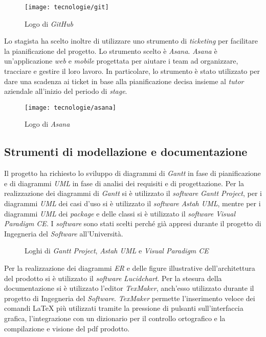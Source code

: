 \begin{figure}[!h] 
    \centering 
    \texttt{[image: tecnologie/git]} 
    \caption{Logo di \textit{GitHub}}
\end{figure}

Lo stagista ha scelto inoltre di utilizzare uno strumento di \textit{ticketing} per facilitare la pianificazione del progetto. Lo strumento scelto è \textit{Asana}. \textit{Asana} è un'applicazione \textit{web} e \textit{mobile} progettata per aiutare i team ad organizzare, tracciare e gestire il loro lavoro. In particolare, lo strumento è stato utilizzato per dare una scadenza ai ticket in base alla pianificazione decisa insieme al \textit{tutor} aziendale all'inizio del periodo di \textit{stage}.

\begin{figure}[!h] 
    \centering 
    \texttt{[image: tecnologie/asana]} 
    \caption{Logo di \textit{Asana}}
\end{figure}

\subsection{Strumenti di modellazione e documentazione}

Il progetto ha richiesto lo sviluppo di diagrammi di \textit{Gantt} in fase di pianificazione e di diagrammi \textit{UML} in fase di analisi dei requisiti e di progettazione. Per la realizzazione dei diagrammi di \textit{Gantt} si è utilizzato il \textit{software} \textit{Gantt Project}, per i diagrammi \textit{UML} dei casi d'uso si è utilizzato il \textit{software} \textit{Astah UML}, mentre per i diagrammi \textit{UML} dei \textit{package} e delle classi si è utilizzato il \textit{software} \textit{Visual Paradigm CE}. I \textit{software} sono stati scelti perché già appresi durante il progetto di Ingegneria del \textit{Software} all'Università.

\begin{figure}[!h] 
    \centering 
    \caption{Loghi di \textit{Gantt Project}, \textit{Astah UML} e \textit{Visual Paradigm CE}}
\end{figure}

Per la realizzazione dei diagrammi \textit{ER} e delle figure illustrative dell'architettura del prodotto si è utilizzato il \textit{software} \textit{Lucidchart}. Per la stesura della documentazione si è utilizzato l'editor \textit{TexMaker}, anch'esso utilizzato durante il progetto di Ingegneria del \textit{Software}. \textit{TexMaker} permette l'inserimento veloce dei comandi \LaTeX{} più utilizzati tramite la pressione di pulsanti sull'interfaccia grafica, l'integrazione con un dizionario per il controllo ortografico e la compilazione e visione del pdf prodotto.


